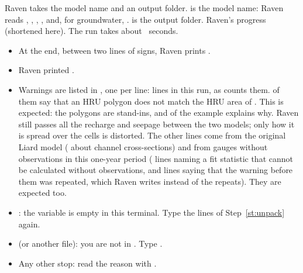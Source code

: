 Raven takes the model name and an output folder.  is the model name: Raven reads , ,
, ,  and, for groundwater, .  is the output folder.
\see Raven's progress (shortened here). The run takes about ~seconds.
\begin{tocheck}
\begin{itemize}
\item At the end, between two lines of \cmd{=} signs, Raven prints .
\item Raven printed .
\item Warnings are listed in , one per line:  lines in this run, as
   counts them.  of them say that
  an HRU polygon does not match the HRU area of . This is expected: the polygons are stand-ins, and
   of the example explains why. Raven still passes all the recharge and seepage between the two models;
  only how it is spread over the cells is distorted. The other lines come from the original Liard model
  ( about channel cross-sections) and from gauges without observations in this one-year period
  ( lines naming a fit statistic that cannot be calculated without observations, and 
  lines saying that the warning before them was repeated, which Raven writes instead of the repeats). They are expected
  too.
\end{itemize}
\end{tocheck}
\begin{trouble}
\begin{itemize}
\item {}: the variable  is empty in this terminal. Type the
   lines of Step~\ref{st:unpack} again.
\item {} (or another file): you are not in . Type .
\item Any other stop: read the reason with .
\end{itemize}
\end{trouble}
